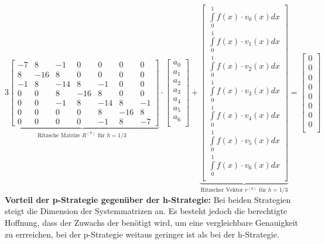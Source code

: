 $\underset{\text{Ritzsche Matrize $R^{(8)}$ für } h=1/3}{\underbrace{3\begin{bmatrix}
	-7& 8 & -1& 0& 0& 0& 0\\
	 8& -16& 8& 0& 0& 0& 0\\
	-1& 8& -14& 8& -1& 0& 0\\ 
	 0& 0& 8& -16& 8& 0& 0\\
	 0& 0& -1& 8& -14& 8& -1\\ 
	 0& 0& 0& 0& 8& -16& 8\\
	 0& 0& 0& 0& -1& 8& -7	
\end{bmatrix}}}\cdot\begin{bmatrix}
	a_0\\
	a_1\\
	a_2\\
	a_3\\
	a_4\\
	a_5\\
	a_6\\
\end{bmatrix}
+\underset{\text{Ritzscher Vektor $r^{(8)}$ für } h=1/3}{\underbrace{\begin{bmatrix}
	\int\limits_{0}^{1}{f(x)\cdot v_0(x)dx}\\
	\int\limits_{0}^{1}{f(x)\cdot v_1(x)dx}\\
	\int\limits_{0}^{1}{f(x)\cdot v_2(x)dx}\\
	\int\limits_{0}^{1}{f(x)\cdot v_3(x)dx}\\
	\int\limits_{0}^{1}{f(x)\cdot v_4(x)dx}\\
	\int\limits_{0}^{1}{f(x)\cdot v_5(x)dx}\\
	\int\limits_{0}^{1}{f(x)\cdot v_6(x)dx}\\
\end{bmatrix}}}=
\begin{bmatrix}
	0\\
	0\\
	0\\
	0\\
	0\\
	0\\
	0\\
	0\\
\end{bmatrix}
$\\

\textbf{Vorteil der p-Strategie gegenüber der h-Strategie:} Bei beiden Strategien steigt die Dimension der Systemmatrizen an. Es besteht jedoch die berechtigte Hoffnung, dass der Zuwachs der benötigt wird, um eine vergleichbare Genauigkeit zu errreichen, bei der p-Strategie weitaus geringer ist als bei der h-Strategie. 

